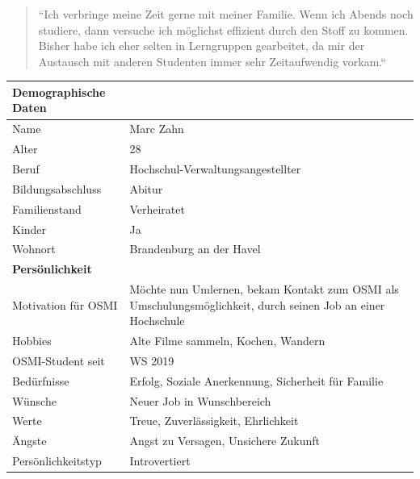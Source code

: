 \documentclass{article}
\begin{document}
\begin{quote}
	\large{``Ich verbringe meine Zeit gerne mit meiner Familie. Wenn ich Abends noch studiere, dann versuche
		ich möglichst effizient durch den Stoff zu kommen. Bisher habe ich eher selten in Lerngruppen gearbeitet,
		da mir der Austausch mit anderen Studenten immer sehr Zeitaufwendig vorkam.``}
\end{quote}

\begin{center}
	\begin{tabularx}{\textwidth}{|l|X|}
		\hline
		\textbf{Demographische Daten} &                                                     \\
		\hline
		Name                          & Marc Zahn                                           \\
		\hline
		Alter                         & 28                                                  \\
		\hline
		Beruf                         & Hochschul-Verwaltungsangestellter                   \\
		\hline
		Bildungsabschluss             & Abitur                                              \\
		\hline
		Familienstand                 & Verheiratet                                         \\
		\hline
		Kinder                        & Ja                                                  \\
		\hline
		Wohnort                       & Brandenburg an der Havel                            \\
		\hline
		\textbf{Persönlichkeit}       &                                                     \\
		\hline
		Motivation für OSMI           & Möchte nun Umlernen, bekam Kontakt zum OSMI als
		Umschulungsmöglichkeit, durch seinen Job an einer Hochschule                        \\
		\hline
		Hobbies                       & Alte Filme sammeln, Kochen, Wandern                 \\
		\hline
		OSMI-Student seit             & WS 2019                                             \\
		\hline
		Bedürfnisse                   & Erfolg, Soziale Anerkennung, Sicherheit für Familie \\
		\hline
		Wünsche                       & Neuer Job in Wunschbereich                          \\
		\hline
		Werte                         & Treue, Zuverlässigkeit, Ehrlichkeit                 \\
		\hline
		Ängste                        & Angst zu Versagen, Unsichere Zukunft                \\
		\hline
		Persönlichkeitstyp            & Introvertiert                                       \\
		\hline
	\end{tabularx}
\end{center}
\end{document}
